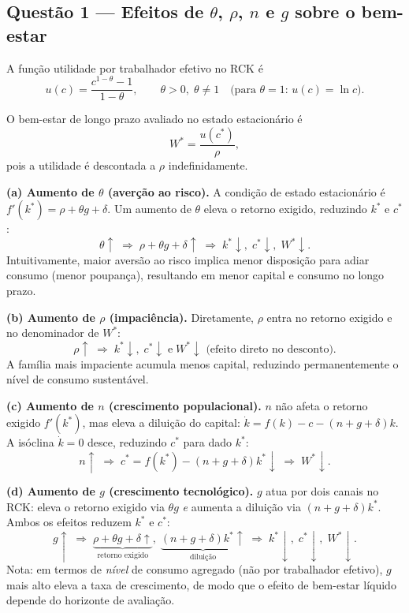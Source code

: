 \documentclass[11pt,a4paper]{article}
\begin{document}
\subsection{Questão 1 --- Efeitos de \(\theta\), \(\rho\), \(n\) e \(g\) sobre o bem-estar}

A fun\c{c}\~ao utilidade por trabalhador efetivo no RCK \'e
\[
  u(c) = \frac{c^{1-\theta}-1}{1-\theta}, \qquad \theta > 0,\;\theta \ne 1
  \quad\text{(para }\theta=1\text{: }u(c)=\ln c\text{)}.
\]

O bem-estar de longo prazo avaliado no estado estacion\'ario \'e
\[
  W^* = \frac{u(c^*)}{\rho},
\]
pois a utilidade \'e descontada a $\rho$ indefinidamente.\medskip

\textbf{(a) Aumento de \(\theta\) (aver\c{c}\~ao ao risco).}
A condi\c{c}\~ao de estado estacion\'ario \'e $f'(k^*) = \rho + \theta g + \delta$.
Um aumento de \(\theta\) eleva o retorno exigido, reduzindo \(k^*\) e \(c^*\):
\[
  \theta \uparrow \;\Longrightarrow\; \rho+\theta g+\delta \uparrow
  \;\Longrightarrow\; k^* \downarrow,\; c^* \downarrow,\; W^* \downarrow.
\]
Intuitivamente, maior avers\~ao ao risco implica menor disposi\c{c}\~ao para
adiar consumo (menor poupan\c{c}a), resultando em menor capital e consumo
no longo prazo.

\textbf{(b) Aumento de \(\rho\) (impaciência).}
Diretamente, $\rho$ entra no retorno exigido e no denominador de $W^*$:
\[
  \rho \uparrow \;\Longrightarrow\; k^* \downarrow,\; c^* \downarrow
  \;\text{e}\; W^* \downarrow \text{ (efeito direto no desconto)}.
\]
A fam\'ilia mais impaciente acumula menos capital, reduzindo permanentemente
o n\'ivel de consumo sustent\'avel.

\textbf{(c) Aumento de \(n\) (crescimento populacional).}
$n$ n\~ao afeta o retorno exigido $f'(k^*)$, mas eleva a dilui\c{c}\~ao
do capital: $\dot k = f(k)-c-(n+g+\delta)k$. A is\'oclina $\dot k = 0$
desce, reduzindo $c^*$ para dado $k^*$:
\[
  n \uparrow \;\Longrightarrow\; c^* = f(k^*) - (n+g+\delta)k^* \downarrow
  \;\Longrightarrow\; W^* \downarrow.
\]

\textbf{(d) Aumento de \(g\) (crescimento tecnológico).}
$g$ atua por dois canais no RCK: eleva o retorno exigido via $\theta g$
\emph{e} aumenta a dilui\c{c}\~ao via $(n+g+\delta)k^*$. Ambos os efeitos
reduzem $k^*$ e $c^*$:
\[
  g \uparrow \;\Longrightarrow\;
  \underbrace{\rho+\theta g+\delta \uparrow}_{\text{retorno exigido}},\;
  \underbrace{(n+g+\delta)k^* \uparrow}_{\text{diluição}}
  \;\Longrightarrow\; k^* \downarrow,\; c^* \downarrow,\; W^* \downarrow.
\]
Nota: em termos de \emph{n\'ivel} de consumo agregado (n\~ao por trabalhador
efetivo), $g$ mais alto eleva a taxa de crescimento, de modo que o efeito
de bem-estar l\'iquido depende do horizonte de avalia\c{c}\~ao.
\end{document}
